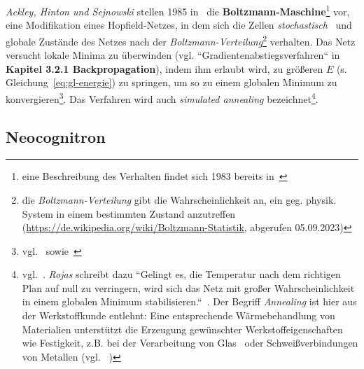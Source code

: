 \textit{Ackley, Hinton und Sejnowski} stellen 1985 in~\cite{AHS85} die \textbf{Boltzmann-Maschine}\footnote{
    eine Beschreibung des Verhalten findet sich 1983 bereits in~\cite{HS83}
} vor, eine Modifikation eines Hopfield-Netzes, in dem sich die Zellen \textit{stochastisch}~\cite[635]{AR88} und globale Zustände des Netzes nach der \textit{Boltzmann-Verteilung}\footnote{
    die \textit{Boltzmann-Verteilung} gibt die Wahrscheinlichkeit an, ein geg. physik. System in einem bestimmten Zustand anzutreffen (\url{https://de.wikipedia.org/wiki/Boltzmann-Statistik}, abgerufen  05.09.2023)
} verhalten. Das Netz versucht lokale Minima zu überwinden (vgl. ``Gradientenabstiegsverfahren`` in \textbf{Kapitel 3.2.1 Backpropagation}), indem ihm erlaubt wird, zu größeren $E$ (s. Gleichung~\ref{eq:gl-energie}) zu springen, um so zu einem globalen Minimum zu konvergieren\footnote{
    vgl.~\cite[151]{AHS85} sowie~\cite[107]{Koh90}
}.
Das Verfahren wird auch \textit{simulated annealing} bezeichnet\footnote{vgl.~\cite[297]{Ert21b}. \textit{Rojas} schreibt dazu
    ``Gelingt es, die Temperatur nach dem richtigen Plan auf null zu verringern, wird sich das Netz mit großer Wahrscheinlichkeit in einem globalen Minimum stabilisieren.``~\cite[322]{Roj93}. Der Begriff \textit{Annealing} ist hier aus der Werkstoffkunde entlehnt: Eine entsprechende Wärmebehandlung von Materialien unterstützt die Erzeugung gewünschter Werkstoffeigenschaften wie Festigkeit, z.B.  bei der Verarbeitung von Glas~\cite[3]{Jeb11} oder Schweißverbindungen von Metallen (vgl. ~\cite{FJOA19})
}.

\subsection{Neocognitron}

